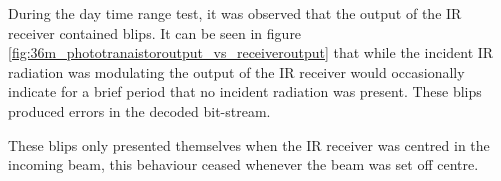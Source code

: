 During the day time range test, it was observed that the output of the IR receiver contained blips. It can be seen in figure \ref{fig:36m_phototranaistoroutput_vs_receiveroutput} that while the incident IR radiation was modulating the output of the IR receiver would occasionally indicate for a brief period that no incident radiation was present. These blips produced errors in the decoded bit-stream.

These blips only presented themselves when the IR receiver was centred in the incoming beam, this behaviour ceased whenever the beam was set off centre.


